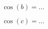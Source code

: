 

\begin{mental}
    
    \begin{center}

    \end{center}

\( \cos(b)=\ldots\)

\( \cos(c)=\ldots\)

\end{mental}
